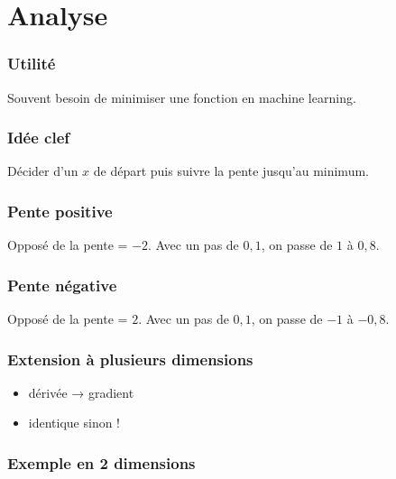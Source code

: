 \documentclass{formation}
\begin{document}
\section{Analyse}

\begin{frame}
  \frametitle{Utilité}

  Souvent besoin de minimiser une fonction en machine learning.


\end{frame}

\begin{frame}
  \frametitle{Idée clef}

  Décider d'un $x$ de départ puis suivre la pente jusqu'au minimum.


\end{frame}

\begin{frame}
  \frametitle{Pente positive}


  Opposé de la pente = $-2$. Avec un pas de $0,1$, on passe de $1$ à $0,8$.
\end{frame}

\begin{frame}
  \frametitle{Pente négative}


  Opposé de la pente = $2$. Avec un pas de $0,1$, on passe de $-1$ à $-0,8$.
\end{frame}

\begin{frame}
  \frametitle{Extension à plusieurs dimensions}
  \begin{itemize}
  \item dérivée → gradient
  \item identique sinon !
  \end{itemize}
\end{frame}

\begin{frame}
  \frametitle{Exemple en 2 dimensions}

\end{frame}
\end{document}
